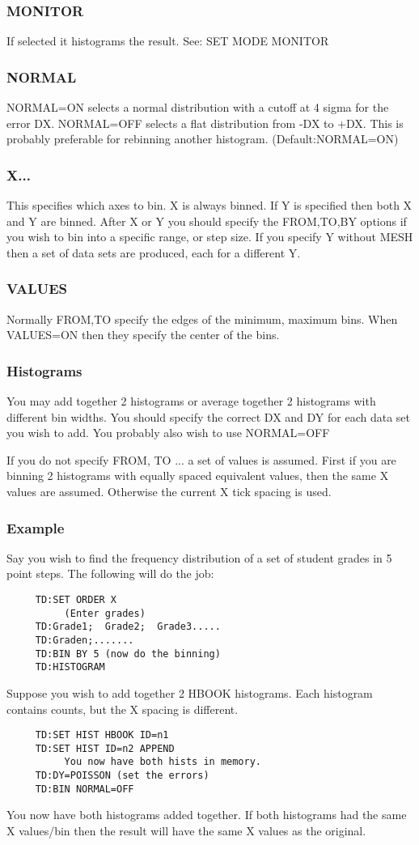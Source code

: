 \subsubsection{MONITOR     }
If selected it histograms the result.  
See:  SET MODE MONITOR 
\subsubsection{NORMAL}
NORMAL=ON  selects  a  normal distribution with a cutoff at 4 sigma for
the error DX.  NORMAL=OFF selects a flat distribution from -DX to  +DX.
This is probably preferable for rebinning another histogram.  
(Default:NORMAL=ON) 
\subsubsection{X...}
This  specifies  which  axes  to  bin.   X  is  always binned.  If Y is
specified then both X and Y are  binned.   After  X  or  Y  you  should
specify  the  FROM,TO,BY  options  if  you  wish to bin into a specific
range, or step size.  If you specify Y without MESH then a set of  data
sets are produced, each for a different Y.  
\subsubsection{VALUES}
Normally  FROM,TO specify the edges of the minimum, maximum bins.  When
VALUES=ON then they specify the center of the bins.  
\subsubsection{Histograms}
You may add together 2 histograms or average together 2 histograms with
different bin widths.  You should specify the correct  DX  and  DY  for
each  data  set  you  wish  to  add.   You  probably  also  wish to use
NORMAL=OFF 

If  you do not specify FROM, TO ...  a set of values is assumed.  First
if you are binning 2 histograms with equally spaced equivalent  values,
then  the  same  X  values  are  assumed.  Otherwise the current X tick
spacing is used.  
\subsubsection{Example}
Say  you  wish  to  find the frequency distribution of a set of student
grades in 5 point steps.  The following will do the job:  
\begin{verbatim}
     TD:SET ORDER X 
          (Enter grades) 
     TD:Grade1;  Grade2;  Grade3.....  
     TD:Graden;.......  
     TD:BIN BY 5 (now do the binning) 
     TD:HISTOGRAM 
\end{verbatim}
Suppose  you  wish  to add together 2 HBOOK histograms.  Each histogram
contains counts, but the X spacing is different.  
\begin{verbatim}
     TD:SET HIST HBOOK ID=n1 
     TD:SET HIST ID=n2 APPEND 
          You now have both hists in memory.  
     TD:DY=POISSON (set the errors) 
     TD:BIN NORMAL=OFF 
\end{verbatim}
You  now  have  both histograms added together.  If both histograms had
the same X values/bin then the result will have the same  X  values  as
the original.  
